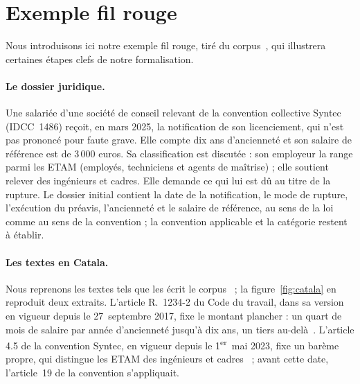 \documentclass[review]{jflart}
\begin{document}
\section{Exemple fil rouge}\label{sec:exemple}
Nous introduisons ici notre exemple fil rouge, tiré du corpus~\cite{corpuslumo}, qui illustrera certaines étapes clefs de notre formalisation.

\paragraph{Le dossier juridique.}
Une salariée d'une société de conseil relevant de la convention collective
Syntec (IDCC~1486) reçoit, en mars 2025, la notification de son licenciement,
qui n'est pas prononcé pour faute grave. Elle compte dix ans d'ancienneté et
son salaire de référence est de 3\,000 euros. Sa classification est discutée :
son employeur la range parmi les ETAM (employés, techniciens et agents de
maîtrise) ; elle soutient relever des ingénieurs et cadres. Elle demande ce
qui lui est dû au titre de la rupture. Le dossier initial contient la date de
la notification, le mode de rupture, l'exécution du préavis, l'ancienneté et le
salaire de référence, au sens de la loi comme au sens de la convention ; la
convention applicable et la catégorie restent à établir.

\paragraph{Les textes en Catala.}
Nous reprenons les textes tels que les écrit le corpus~\cite{corpuslumo} ;
la figure~\ref{fig:catala} en reproduit deux extraits. L'article R.~1234-2 du Code
du travail, dans sa version en vigueur depuis le 27~septembre 2017, fixe le
montant plancher : un quart de mois de salaire par année d'ancienneté jusqu'à
dix ans, un tiers au-delà~\cite{frcode}. L'article 4.5 de la convention Syntec,
en vigueur depuis le 1\textsuperscript{er}~mai 2023, fixe un barème propre, qui
distingue les ETAM des ingénieurs et cadres~\cite{syntec} ; avant cette date,
l'article~19 de la convention s'appliquait.
\end{document}
